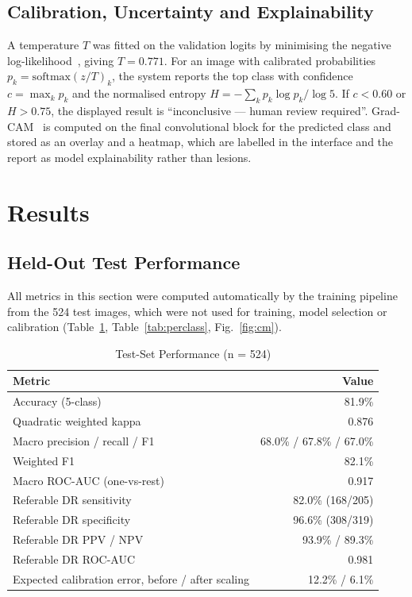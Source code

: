 \documentclass[conference]{IEEEtran}
\begin{document}
\subsection{Calibration, Uncertainty and Explainability}
A temperature $T$ was fitted on the validation logits by minimising the negative log-likelihood~\cite{guo2017}, giving
$T = 0.771$. For an image with calibrated probabilities $p_k = \mathrm{softmax}(z/T)_k$, the system reports the top
class with confidence $c = \max_k p_k$ and the normalised entropy $H = -\sum_k p_k \log p_k / \log 5$. If $c < 0.60$ or
$H > 0.75$, the displayed result is ``inconclusive --- human review required''. Grad-CAM~\cite{selvaraju2017} is
computed on the final convolutional block for the predicted class and stored as an overlay and a heatmap, which are
labelled in the interface and the report as model explainability rather than lesions.

\section{Results}
\subsection{Held-Out Test Performance}
All metrics in this section were computed automatically by the training pipeline from the 524 test images, which were
not used for training, model selection or calibration (Table~\ref{tab:metrics}, Table~\ref{tab:perclass},
Fig.~\ref{fig:cm}).

\begin{table}[t]
\caption{Test-Set Performance (n = 524)}
\label{tab:metrics}
\centering\scriptsize
\begin{tabular}{@{}lr@{}}
\toprule
Metric & Value \\
\midrule
Accuracy (5-class) & 81.9\% \\
Quadratic weighted kappa & 0.876 \\
Macro precision / recall / F1 & 68.0\% / 67.8\% / 67.0\% \\
Weighted F1 & 82.1\% \\
Macro ROC-AUC (one-vs-rest) & 0.917 \\
\midrule
Referable DR sensitivity & 82.0\% (168/205) \\
Referable DR specificity & 96.6\% (308/319) \\
Referable DR PPV / NPV & 93.9\% / 89.3\% \\
Referable DR ROC-AUC & 0.981 \\
\midrule
Expected calibration error, before / after scaling & 12.2\% / 6.1\% \\
\bottomrule
\end{tabular}
\end{table}
\end{document}
